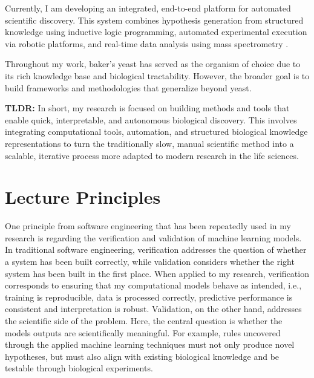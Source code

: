 \documentclass[11pt,compsoc,a4paper]{IEEEtran}
\begin{document}
Currently, I am developing an integrated, end-to-end platform for automated scientific discovery. This system combines hypothesis generation from structured knowledge using inductive logic programming, automated experimental execution via robotic platforms, and real-time data analysis using mass spectrometry \cite{brunnsaker2025agentic}. 

Throughout my work, baker's yeast has served as the organism of choice due to its rich knowledge base and biological tractability. However, the broader goal is to build frameworks and methodologies that generalize beyond yeast.

\vspace{0.25cm}

\noindent \textbf{TLDR:} In short, my research is focused on building methods and tools that enable quick, interpretable, and autonomous biological discovery. This involves integrating computational tools, automation, and structured biological knowledge representations to turn the traditionally slow, manual scientific method into a scalable, iterative process more adapted to modern research in the life sciences.

\section{Lecture Principles}

    One principle from software engineering that has been repeatedly used in my research is regarding the verification and validation of machine learning models. In traditional software engineering, verification addresses the question of whether a system has been built correctly, while validation considers whether the right system has been built in the first place. When applied to my research, verification corresponds to ensuring that my computational models behave as intended, i.e., training is reproducible, data is processed correctly, predictive performance is consistent and interpretation is robust. Validation, on the other hand, addresses the scientific side of the problem. Here, the central question is whether the models outputs are scientifically meaningful. For example, rules uncovered through the applied machine learning techniques must not only produce novel hypotheses, but must also align with existing biological knowledge and be testable through biological experiments. 
\end{document}
